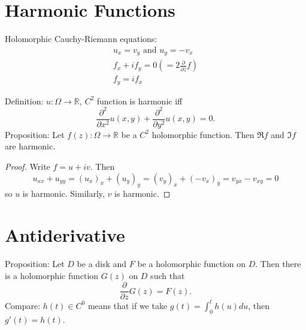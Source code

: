 \documentclass{artikel3}
\date{\formatdate{2012}{04}{06}}
\newcommand{\reals}{\mathbb{R}}
\newcommand{\complex}{\mathbb{R}}
\newcommand{\del}{\partial}
\begin{document}
\newcommand{\eqcite}[1]{\text{[#1]}}
\newcommand{\eqnref}[1]{Stmt. \ref{#1}}
\newcommand{\expval}[1]{\left\langle #1\right\rangle}
\newcommand{\closure}[1]{\overline{#1}}
\section{Harmonic Functions}
Holomorphic Cauchy-Riemann equations:
\begin{gather*}
	u_x=v_y\text{ and }u_y=-v_x\\
	f_x+if_y=0(=2\frac{\del}{\del \bar{z}}f)\\
	f_y=if_x
\end{gather*}

Definition: $u:\Omega\to \reals$, $C^2$ function is harmonic iff \[
	\frac{\del^2}{\del x^2}u(x,y)+\frac{\del^2}{\del y^2}u(x,y)=0.
\] Proposition: Let $f(z):\Omega\to \complex$ be a $C^2$ holomorphic function.  Then
$\Re{f}$ and $\Im{f}$ are harmonic.

\begin{proof}
	Write $f=u+iv$.  Then \[
		u_{xx}+u_{yy}=(u_x)_x+(u_y)_y
		=(v_y)_x+(-v_x)_y=v_{yx}-v_{xy}=0
	\] so $u$ is harmonic.  Similarly, $v$ is harmonic.
\end{proof}

\section{Antiderivative}
Proposition: Let $D$ be a disk and $F$ be a holomorphic function on $D$.  Then there is
a holomorphic function $G(z)$ on $D$ such that \[
	\frac{\del}{\del z}G(z)=F(z).
\] Compare: $h(t)\in C^0$ means that if we take $g(t)=\int_0^t h(u)du$, then $g'(t)=h(t)$.
\end{document}
